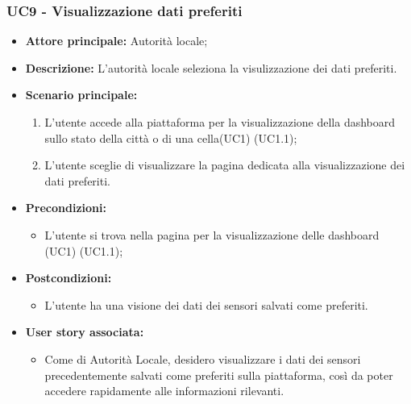 \subsubsection{UC9 - Visualizzazione dati preferiti}
\begin{itemize}
    \item \textbf{Attore principale:} Autorità locale;
    \item \textbf{Descrizione:} L’autorità locale seleziona la visulizzazione dei dati preferiti.
    \item \textbf{Scenario principale:}
          \begin{enumerate}
              \item L'utente accede alla piattaforma per la visualizzazione della dashboard sullo stato della città o di una cella(UC1) (UC1.1);
              \item L'utente sceglie di visualizzare la pagina dedicata alla visualizzazione dei dati preferiti.
          \end{enumerate}
    \item \textbf{Precondizioni:}
          \begin{itemize}
              \item  L'utente si trova nella pagina per la visualizzazione delle dashboard (UC1) (UC1.1);
          \end{itemize}
    \item \textbf{Postcondizioni:}
          \begin{itemize}
              \item  L'utente ha una visione dei dati dei sensori salvati come preferiti.
          \end{itemize}
    \item \textbf{User story associata:}
          \begin{itemize}
              \item Come di Autorità Locale, desidero visualizzare i dati dei sensori precedentemente salvati come preferiti sulla piattaforma, così da poter accedere rapidamente alle informazioni rilevanti.
          \end{itemize}
\end{itemize}
